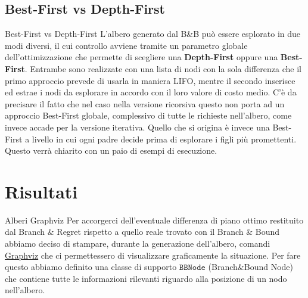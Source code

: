 \documentclass[10pt]{beamer}
\begin{document}
    \subsection{Best-First vs Depth-First}\label{sec:bf-vs-df}
    \begin{frame}{Best-First vs Depth-First}
        L'albero generato dal B\&B può essere esplorato in due modi diversi, il cui controllo avviene tramite un parametro globale dell'ottimizzazione che permette di scegliere una \textbf{Depth-First} oppure una \textbf{Best-First}. Entrambe sono realizzate con una lista di nodi con la sola differenza che il primo approccio prevede di usarla in maniera LIFO, mentre il secondo inserisce ed estrae i nodi da esplorare in accordo con il loro valore di costo medio. C'è da precisare il fatto che nel caso nella versione ricorsiva questo non porta ad un approccio Best-First globale, complessivo di tutte le richieste nell'albero, come invece accade per la versione iterativa. Quello che si origina è invece una Best-First a livello in cui ogni padre decide prima di esplorare i figli più promettenti. Questo verrà chiarito con un paio di esempi di esecuzione.
    \end{frame}

    \section{Risultati}\label{sec:risultati}
    \begin{frame}{Alberi Graphviz}
        Per accorgerci dell'eventuale differenza di piano ottimo restituito dal Branch \& Regret rispetto a quello reale trovato con il Branch \& Bound abbiamo deciso di stampare, durante la generazione dell'albero, comandi \href{https://graphviz.org/}{Graphviz} che ci permettessero di visualizzare graficamente la situazione.
        \newline
        \newline
        Per fare questo abbiamo definito una classe di supporto $\texttt{BBNode}$ (Branch\&Bound Node) che contiene tutte le informazioni rilevanti riguardo alla posizione di un nodo nell'albero.
    \end{frame}
\end{document}
